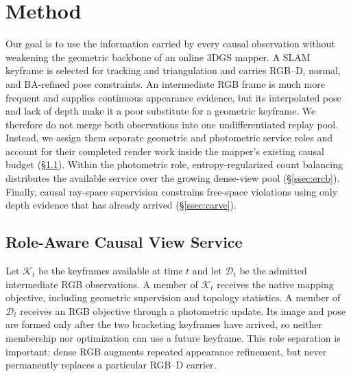 
\section{Method}
\label{sec:method}

Our goal is to use the information carried by every causal observation without
weakening the geometric backbone of an online 3DGS mapper.  A SLAM keyframe is
selected for tracking and triangulation and carries RGB--D, normal, and
BA-refined pose constraints.  An intermediate RGB frame is much more frequent
and supplies continuous appearance evidence, but its interpolated pose and
lack of depth make it a poor substitute for a geometric keyframe.  We therefore
do not merge both observations into one undifferentiated replay pool.  Instead,
we assign them separate geometric and photometric service roles and account for
their completed render work inside the mapper's existing causal budget
(\S\ref{ssec:growth}).  Within the photometric role, entropy-regularized
count balancing distributes the available service over the growing dense-view
pool (\S\ref{ssec:ercb}).  Finally, causal ray-space supervision constrains
free-space violations using only depth evidence that has already arrived
(\S\ref{ssec:carve}).



\subsection{Role-Aware Causal View Service}
\label{ssec:growth}

Let $\mathcal K_t$ be the keyframes available at time $t$ and let
$\mathcal D_t$ be the admitted intermediate RGB observations.  A member of
$\mathcal K_t$ receives the native mapping objective, including geometric
supervision and topology statistics.  A member of $\mathcal D_t$ receives an
RGB objective through a photometric update.  Its image and pose are formed only
after the two bracketing keyframes have arrived, so neither membership nor
optimization can use a future keyframe.  This role separation is important:
dense RGB augments repeated appearance refinement, but never permanently
replaces a particular RGB--D carrier.

